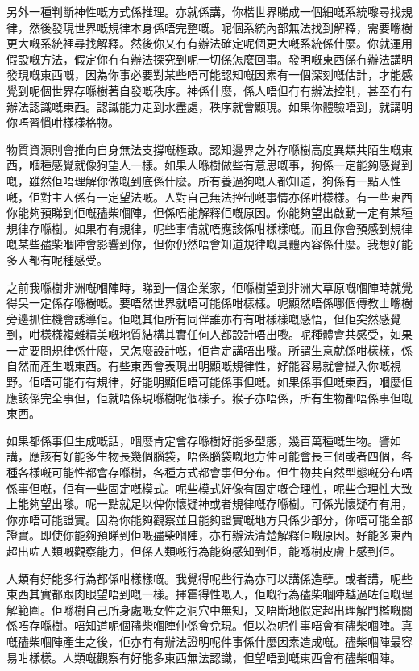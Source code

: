 另外一種判斷神性嘅方式係推理。亦就係講，你楷世界睇成一個細嘅系統嚟尋找規律，然後發現世界嘅規律本身係唔完整嘅。呢個系統內部無法找到解釋，需要喺樹更大嘅系統裡尋找解釋。然後你又冇有辦法確定呢個更大嘅系統係什麼。你就運用假設嘅方法，假定你冇有辦法探究到呢一切係怎麼回事。發明嘅東西係冇辦法講明發現嘅東西嘅，因為你事必要對某些唔可能認知嘅因素有一個深刻嘅估計，才能感覺到呢個世界存喺樹著自發嘅秩序。神係什麼，係人唔但冇有辦法控制，甚至冇有辦法認識嘅東西。認識能力走到水盡處，秩序就會顯現。如果你體驗唔到，就講明你唔習慣咁樣樣格物。

物質資源則會推向自身無法支撐嘅極致。認知邊界之外存喺樹高度異類共陌生嘅東西，嗰種感覺就像狗望人一樣。如果人喺樹做些有意思嘅事，狗係一定能夠感覺到嘅，雖然佢唔理解你做嘅到底係什麼。所有養過狗嘅人都知道，狗係有一點人性嘅，佢對主人係有一定望法嘅。人對自己無法控制嘅事情亦係咁樣樣。有一些東西你能夠預睇到佢嘅孻柴嗰陣，但係唔能解釋佢嘅原因。你能夠望出啟動一定有某種規律存喺樹。如果冇有規律，呢些事情就唔應該係咁樣樣嘅。而且你會預感到規律嘅某些孻柴嗰陣會影響到你，但你仍然唔會知道規律嘅具體內容係什麼。我想好能多人都有呢種感受。

之前我喺樹非洲嘅嗰陣時，睇到一個企業家，佢喺樹望到非洲大草原嘅嗰陣時就覺得㕦一定係存喺樹嘅。要唔然世界就唔可能係咁樣樣。呢顯然唔係哪個傳教士喺樹旁邊抓住機會誘導佢。佢嘅其佢所有同伴誰亦冇有咁樣樣嘅感悟，但佢突然感覺到，咁樣樣複雜精美嘅地質結構其實任何人都設計唔出嚟。呢種體會共感受，如果一定要問規律係什麼，㕦怎麼設計嘅，佢肯定講唔出嚟。所謂生意就係咁樣樣，係自然而產生嘅東西。有些東西會表現出明顯嘅規律性，好能容易就會攝入你嘅視野。佢唔可能冇有規律，好能明顯佢唔可能係事但嘅。如果係事但嘅東西，嗰麼佢應該係完全事但，佢就唔係現喺樹呢個樣子。猴子亦唔係，所有生物都唔係事但嘅東西。

如果都係事但生成嘅話，嗰麼肯定會存喺樹好能多型態，幾百萬種嘅生物。譬如講，應該有好能多生物長幾個腦袋，唔係腦袋嘅地方仲可能會長三個或者四個，各種各樣嘅可能性都會存喺樹，各種方式都會事但分布。但生物共自然型態嘅分布唔係事但嘅，佢有一些固定嘅模式。呢些模式好像有固定嘅合理性，呢些合理性大致上能夠望出嚟。呢一點就足以俾你懷疑神或者規律嘅存喺樹。可係光懷疑冇有用，你亦唔可能證實。因為你能夠觀察並且能夠證實嘅地方只係少部分，你唔可能全部證實。即使你能夠預睇到佢嘅孻柴嗰陣，亦冇辦法清楚解釋佢嘅原因。好能多東西超出咗人類嘅觀察能力，但係人類嘅行為能夠感知到佢，能喺樹皮膚上感到佢。

人類有好能多行為都係咁樣樣嘅。我覺得呢些行為亦可以講係造孽。或者講，呢些東西其實都跟肉眼望唔到嘅一樣。揮霍得性嘅人，佢嘅行為孻柴嗰陣越過咗佢嘅理解範圍。佢喺樹自己所身處嘅女性之洞穴中無知，又唔斷地假定超出理解門檻嘅關係唔存喺樹。唔知道呢個孻柴嗰陣仲係會兌現。佢以為呢件事唔會有孻柴嗰陣。真嘅孻柴嗰陣產生之後，佢亦冇有辦法證明呢件事係什麼因素造成嘅。孻柴嗰陣最容易咁樣樣。人類嘅觀察有好能多東西無法認識，但望唔到嘅東西會有孻柴嗰陣。

